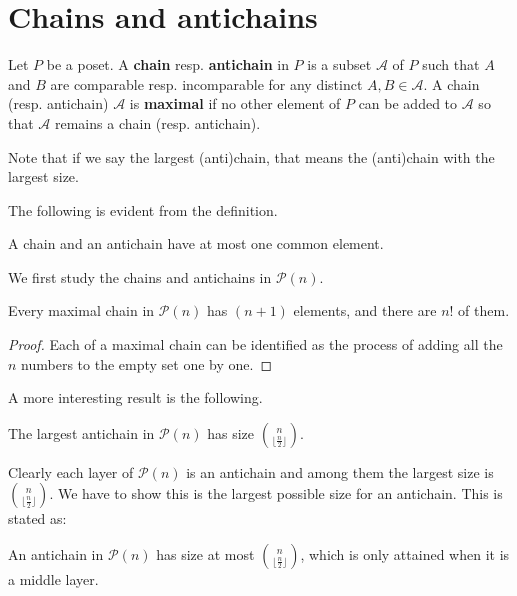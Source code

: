 \section{Chains and antichains}

\begin{definition}
  Let $P$ be a poset. A \textbf{chain} resp. \textbf{antichain} in $P$ is a subset $\mathcal{A}$ of $P$ such that $A$ and $B$ are comparable resp. incomparable for any distinct $A, B \in  \mathcal{A}$.   A chain (resp. antichain) $\mathcal{A}$  is \textbf{maximal} if no other element of $P$  can be added to $\mathcal{A}$ so that $\mathcal{A}$ remains a chain (resp. antichain). 
\end{definition}

Note that if we say the largest (anti)chain, that means the (anti)chain with the largest size.

The following is evident from the definition.
\begin{lemma} \label{lem:chain-antichain-at-most-one-common}
  A chain and an antichain have at most one common element.
\end{lemma}

We first study the chains and antichains in $\mathcal{P}(n)$. 

\begin{proposition}
  Every maximal chain in $\mathcal{P}(n)$ has $(n+1)$ elements, and there are $n!$ of them.   
\end{proposition}

\begin{proof}
  Each of a maximal chain can be identified as the process of adding all the $n$ numbers to the empty set one by one. 
\end{proof}


A more interesting result is the following.

\begin{theorem}
  The largest antichain in $\mathcal{P}(n)$ has size $\binom{n}{\lfloor \frac{n}{2} \rfloor}$.  
\end{theorem}


Clearly each layer of $\mathcal{P}(n)$ is an antichain and among them the largest size is  $\binom{n}{\lfloor \frac{n}{2} \rfloor}$. We have to show this is the largest possible size for an antichain. This is stated as:

\begin{theorem}
  An antichain in $\mathcal{P}(n)$ has size at most $\binom{n}{\lfloor \frac{n}{2} \rfloor}$, which is only attained when it is a middle layer.
\end{theorem}

